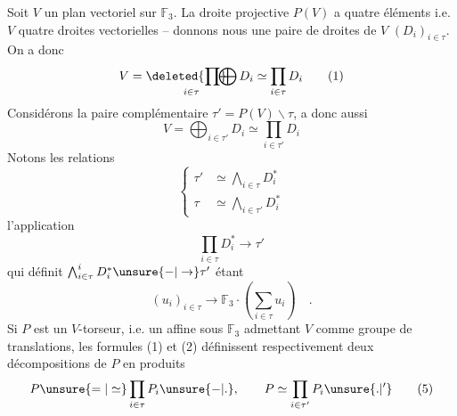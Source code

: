 Soit $V$ un plan vectoriel sur $\mathbb F_3$. La droite projective $P(V)$ a quatre éléments i.e. $V$  quatre droites vectorielles -- donnons nous une paire  de droites de $V$ $(D_i)_{i\in\tau}$. On a donc
\[
V=\mathop{\deleted{\prod}\mkern-15mu\bigoplus}_{i\in\tau}D_i\simeq\prod_{i\in\tau}D_i
\tag*{(1)}
\]
Considérons la paire complémentaire $\tau'=P(V)\smallsetminus\tau$,  a donc aussi
\[
V=\bigoplus_{i\in\tau'}D_i\simeq\prod_{i\in\tau'}D_i
\tag*{(2)}
\]
Notons les relations
\[
\left\{\begin{aligned}
\tau'&\simeq\bigwedge_{i\in\tau}D_i^*\\
\tau&\simeq\bigwedge_{i\in\tau'}D_i^*
\end{aligned}\right.
\tag*{(3)}
\]
l'application
\[
\prod_{i\in\tau}D_i^*\longrightarrow\tau'
\]
qui définit $\bigwedge_{i\in\tau}^{i}D_i^*\unsure{\mathord{-}|\to}\tau'$ étant
\[
(u_i)_{i\in\tau}\longrightarrow\mathbb F_3\mathbin{\cdot}
\left(\sum_{i\in\tau}u_i\right)\quad.
\tag*{(4)}
\]
Si $P$ est un $V$-torseur, i.e. un  affine sous $\mathbb F_3$ admettant $V$ comme groupe de translations,  les formules (1) et (2) définissent respectivement deux décompositions de $P$ en produits
\[
P\unsure{=|\simeq}\prod_{i\in\tau}P_i\unsure{\mathord{-}|\mathord{.}},\qquad
P\simeq\prod_{i\in\tau'}P_i\unsure{.|'}
\tag*{(5)}
\]


